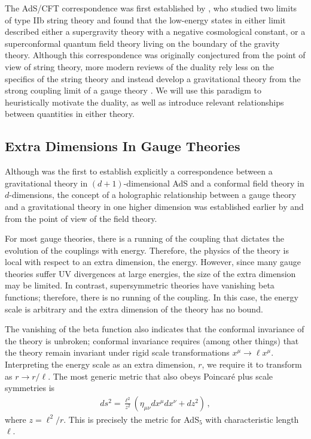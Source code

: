 \documentclass[../PhD.tex]{subfiles}
\begin{document}
The AdS/CFT correspondence was first established by \cite{hep-th/9711200}, who studied two limits of type IIb string theory and found that the low-energy states in either limit described either a supergravity theory with a negative cosmological constant, or a superconformal quantum field theory living on the boundary of the gravity theory. Although this correspondence was originally conjectured from the point of view of string theory, more modern reviews of the duality rely less on the specifics of the string theory and instead develop a gravitational theory from the strong coupling limit of a gauge theory \cite{gr-qc/0602037}. We will use this paradigm to heuristically motivate the duality, as well as introduce relevant relationships between quantities in either theory.  


\subsection{Extra Dimensions In Gauge Theories}
\label{ssec: extra dims in gauge theories}

Although \cite{hep-th/9711200} was the first to establish explicitly a correspondence between a gravitational theory in $(d+1)$-dimensional AdS and a conformal field theory in $d$-dimensions, the concept of a holographic relationship between a gauge theory and a gravitational theory in one higher dimension was established earlier by \cite{gr-qc/9310026} and \cite{hep-th/9409089} from the point of view of the field theory. 

For most gauge theories, there is a running of the coupling that dictates the evolution of the couplings with energy. Therefore, the physics of the theory is local with respect to an extra dimension, the energy. However, since many gauge theories suffer UV divergences at large energies, the size of the extra dimension may be limited. In contrast, supersymmetric theories have vanishing beta functions; therefore, there is no running of the coupling. In this case, the energy scale is arbitrary and the extra dimension of the theory has no bound.

The vanishing of the beta function also indicates that the conformal invariance of the theory is unbroken; conformal invariance requires (among other things) that the theory remain invariant under rigid scale transformations $x^\mu \to \ell x^\mu$. Interpreting the energy scale as an extra dimension, $r$, we require it to transform as $r \to r/ \ell$. The most generic metric that also obeys Poincar\'e plus scale symmetries is
\begin{align}
\label{Poincare ads}
ds^2 = \frac{\ell^2}{z^2} \left( \eta_{\mu \nu}dx^\mu dx^\nu +dz^2 \right) \, ,
\end{align}
where $z = \ell^2 / r$. This is precisely the metric for AdS$_5$ with characteristic length $\ell$. 
\end{document}
